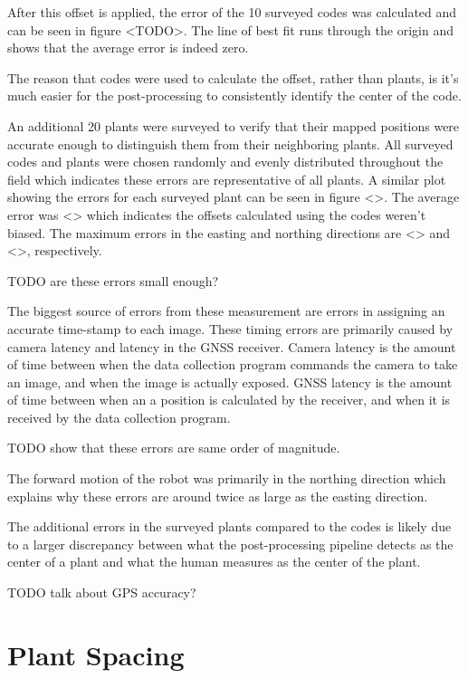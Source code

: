 After this offset is applied, the error of the 10 surveyed codes was calculated and can be seen in figure <TODO>.  The line of best fit runs through the origin and shows that the average error is indeed zero.    


The reason that codes were used to calculate the offset, rather than plants, is it's much easier for the post-processing to consistently identify the center of the code. 

An additional 20 plants were surveyed to verify that their mapped positions were accurate enough to distinguish them from their neighboring plants.  All surveyed codes and plants were chosen randomly and evenly distributed throughout the field which indicates these errors are representative of all plants.   A similar plot showing the errors for each surveyed plant can be seen in figure <>.  The average error was <> which indicates the offsets calculated using the codes weren't biased.  The maximum errors in the easting and northing directions are <> and <>, respectively.  

TODO are these errors small enough?



The biggest source of errors from these measurement are errors in assigning an accurate time-stamp to each image.  These timing errors are primarily caused by camera latency and latency in the GNSS receiver.  Camera latency is the amount of time between when the data collection program commands the camera to take an image, and when the image is actually exposed.  GNSS latency is the amount of time between when an a position is calculated by the receiver, and when it is received by the data collection program.  

TODO show that these errors are same order of magnitude.

The forward motion of the robot was primarily in the northing direction which explains why these errors are around twice as large as the easting direction.  

The additional errors in the surveyed plants compared to the codes is likely due to a larger discrepancy between what the post-processing pipeline detects as the center of a plant and what the human measures as the center of the plant. 

TODO talk about GPS accuracy?

\section{Plant Spacing}

